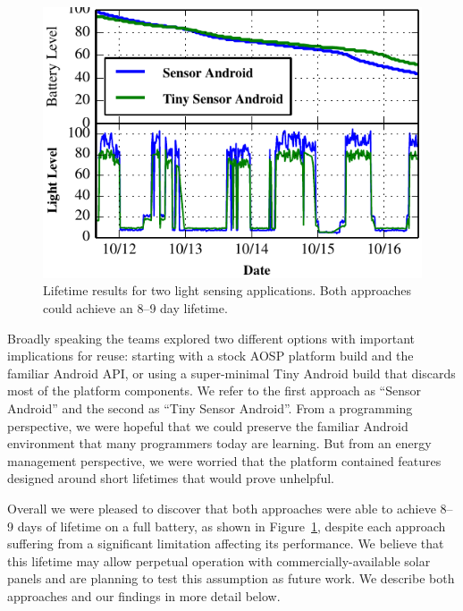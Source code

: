 \begin{figure}[t]
\includegraphics[width=\columnwidth]{./figures/comparison.pdf}

\vspace*{-0.1in}

\caption{\small Lifetime results for two light sensing applications.
\textnormal{Both approaches could achieve an 8--9 day lifetime.}}

\vspace*{-0.1in}

\label{fig-comparison}
\end{figure}

Broadly speaking the teams explored two different options with important
implications for reuse: starting with a stock AOSP platform build and the
familiar Android API, or using a super-minimal Tiny Android build that
discards most of the platform components. We refer to the first approach as
``Sensor Android'' and the second as ``Tiny Sensor Android''. From a
programming perspective, we were hopeful that we could preserve the familiar
Android environment that many programmers today are learning. But from an
energy management perspective, we were worried that the platform contained
features designed around short lifetimes that would prove unhelpful.

Overall we were pleased to discover that both approaches were able to achieve
8--9 days of lifetime on a full battery, as shown in
Figure~\ref{fig-comparison}, despite each approach suffering from a
significant limitation affecting its performance. We believe that this
lifetime may allow perpetual operation with commercially-available solar
panels and are planning to test this assumption as future work. We describe
both approaches and our findings in more detail below.

